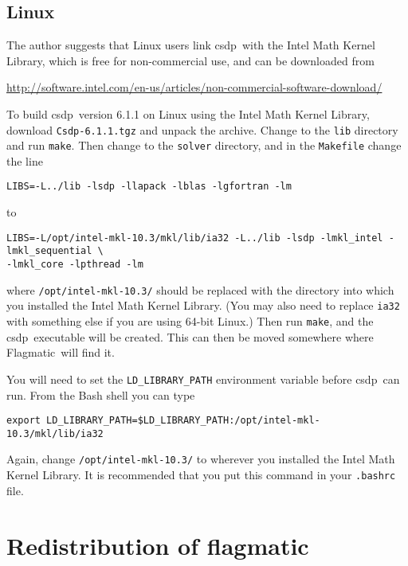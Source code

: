 \documentclass{article}
\let\temptt\texttt
\renewcommand\texttt[1]{{\color{excolor} \temptt{#1}}}
\providecommand{\flagmatic}{Flagmatic}
\providecommand{\csdp}{csdp}
\begin{document}
\subsection{Linux}

The author suggests that Linux users link \csdp\ with the Intel Math Kernel Library, which is free for non-commercial use, and can be downloaded from

\url{http://software.intel.com/en-us/articles/non-commercial-software-download/}

To build \csdp\ version 6.1.1 on Linux using the Intel Math Kernel Library, download \texttt{Csdp-6.1.1.tgz} and unpack the archive. Change to the \texttt{lib} directory and run \texttt{make}. Then change to the \texttt{solver} directory, and in the \texttt{Makefile} change the line

\begin{verbatim}
LIBS=-L../lib -lsdp -llapack -lblas -lgfortran -lm
\end{verbatim}

to

\begin{verbatim}
LIBS=-L/opt/intel-mkl-10.3/mkl/lib/ia32 -L../lib -lsdp -lmkl_intel -lmkl_sequential \
-lmkl_core -lpthread -lm
\end{verbatim}

where \texttt{/opt/intel-mkl-10.3/} should be replaced with the directory into which you installed the Intel Math Kernel Library. (You may also need to replace \texttt{ia32} with something else if you are using 64-bit Linux.) Then run \texttt{make}, and the \csdp\ executable will be created. This can then be moved somewhere where \flagmatic\  will find it.

You will need to set the \texttt{LD\_LIBRARY\_PATH} environment variable before \csdp\ can run. From the Bash shell you can type

\begin{verbatim}
export LD_LIBRARY_PATH=$LD_LIBRARY_PATH:/opt/intel-mkl-10.3/mkl/lib/ia32
\end{verbatim}

Again, change \texttt{/opt/intel-mkl-10.3/} to wherever you installed the Intel Math Kernel Library. It is recommended that you put this command in your \texttt{.bashrc} file.




\section{Redistribution of flagmatic} \label{license}
\end{document}
